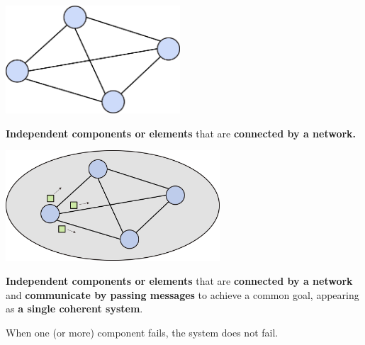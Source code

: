 \begin{slide}


    \includegraphics[width=65mm]{dfs-definition-2.png}
    \bigskip

    \textbf{Independent components or elements} that are \textbf{connected by a network.}

\end{slide}

\begin{slide}


    \includegraphics[width=80mm]{dfs-definition-4.png}
    \bigskip

    \textbf{Independent components or elements} that are \textbf{connected by a network} and \textbf{communicate by passing messages} to achieve a common goal, appearing as \textbf{a single coherent system}.
    \bigskip

    When one (or more) component fails, the system does not fail.

\end{slide}

